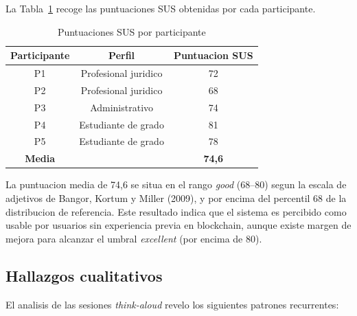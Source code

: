 \documentclass[11pt, a4paper]{article}
\begin{document}
La Tabla~\ref{tab:sus} recoge las puntuaciones SUS obtenidas por cada participante.

\begin{table}[H]
\centering
\renewcommand{\arraystretch}{1.3}
\begin{tabular}{|c|c|c|}
\hline
\textbf{Participante} & \textbf{Perfil} & \textbf{Puntuacion SUS} \\
\hline
P1 & Profesional juridico & 72 \\
\hline
P2 & Profesional juridico & 68 \\
\hline
P3 & Administrativo & 74 \\
\hline
P4 & Estudiante de grado & 81 \\
\hline
P5 & Estudiante de grado & 78 \\
\hline
\textbf{Media} & & \textbf{74,6} \\
\hline
\end{tabular}
\caption{Puntuaciones SUS por participante}
\label{tab:sus}
\end{table}

La puntuacion media de 74,6 se situa en el rango \textit{good} (68--80) segun la escala de adjetivos de Bangor, Kortum y Miller (2009), y por encima del percentil 68 de la distribucion de referencia. Este resultado indica que el sistema es percibido como usable por usuarios sin experiencia previa en blockchain, aunque existe margen de mejora para alcanzar el umbral \textit{excellent} (por encima de 80).

\subsection{Hallazgos cualitativos}

El analisis de las sesiones \textit{think-aloud} revelo los siguientes patrones recurrentes:
\end{document}
